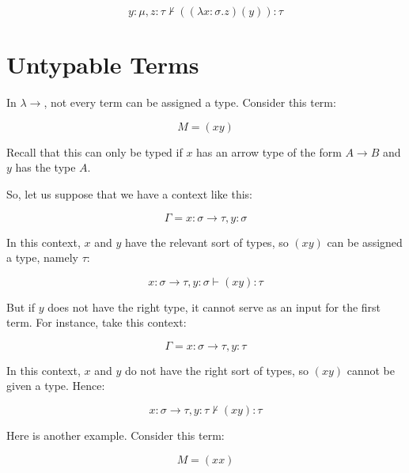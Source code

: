 \documentclass{book}
\numberwithin{equation}{chapter}
\begin{document}
\begin{equation}
y : \mu, z : \tau \not \vdash ((\lambda x : \sigma.z) (y)) : \tau
\end{equation}


\section{Untypable Terms}

In $\lambda\rightarrow$, not every term can be assigned a type. Consider this term:

\begin{equation}
M = (x y)
\end{equation}

\noindent
Recall that this can only be typed if $x$ has an arrow type of the form $A \rightarrow B$ and $y$ has the type $A$. 

So, let us suppose that we have a context like this:

\begin{equation}
\Gamma = x : \sigma \rightarrow \tau, y : \sigma
\end{equation}

\noindent
In this context, $x$ and $y$ have the relevant sort of types, so $(x y)$ can be assigned a type, namely $\tau$:

\begin{equation}
x : \sigma \rightarrow \tau, y : \sigma \vdash (x y) : \tau
\end{equation}

\noindent
But if $y$ does not have the right type, it cannot serve as an input for the first term. For instance, take this context:

\begin{equation}
\Gamma = x : \sigma \rightarrow \tau, y : \tau
\end{equation}

\noindent
In this context, $x$ and $y$ do not have the right sort of types, so $(x y)$ cannot be given a type. Hence:

\begin{equation}
x : \sigma \rightarrow \tau, y : \tau \not \vdash (x y) : \tau
\end{equation}

\noindent
Here is another example. Consider this term:

\begin{equation}
M = (x x)
\end{equation}
\end{document}
